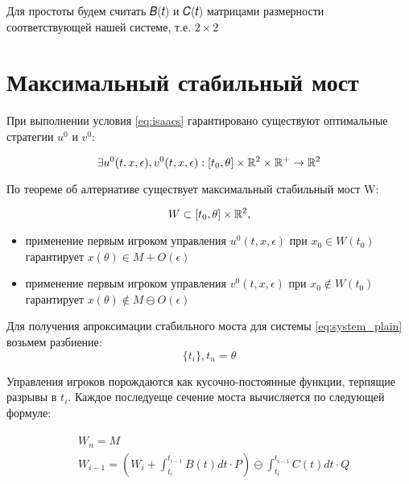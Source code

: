 Для простоты будем считать 𝐵(𝑡) и 𝐶(𝑡) матрицами
размерности соответствующей нашей системе, т.е. $2\times2$

\section{Максимальный стабильный мост}

При выполнении условия \ref{eq:isaacs}
гарантировано существуют оптимальные стратегии
$u^0$ и $v^0$: 

\begin{equation}
    \exists u^0(t,x,\epsilon), v^0(t,x,\epsilon):
    [t_0, \theta] \times \mathbb{R}^2 \times \mathbb{R}^+
    \rightarrow \mathbb{R}^2
\end{equation}

По теореме об алтернативе существует
максимальный стабильный мост W:

\begin{equation}
    W \subset [t_0,\theta] \times \mathbb{R}^2,
\end{equation}

\begin{itemize}
    \item применение первым игроком управления $u^0(t,x,\epsilon)$
    при $x_0 \in W(t_0)$ гарантирует $x(\theta) \in M + O(\epsilon)$
    \item применение первым игроком управления $v^0(t,x,\epsilon)$
    при $x_0 \notin W(t_0)$ гарантирует $x(\theta) \notin M \ominus O(\epsilon)$
\end{itemize}

Для получения апроксимации стабильного моста
для системы \ref{eq:system_plain} возьмем разбиение:
\begin{equation}
    \{t_i\}, t_n = \theta
\end{equation}

Управления игроков порождаются как кусочно-постоянные функции,
терпящие разрывы в $𝑡_i$.
Каждое последуеще сечение моста вычисляется по следующей формуле:

\begin{eqnarray}
    \begin{aligned}
        &W_n = M\\
        &W_{i-1} =
        \left(W_i+\int_{t_i}^{t_{i-1}} B(t) dt \cdot P\right)
            \ominus
        \int_{t_i}^{t_{i-1}} C(t) dt \cdot Q
    \end{aligned}
\end{eqnarray}
